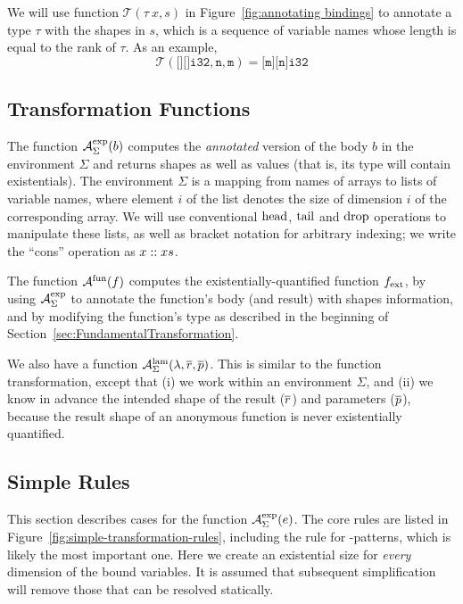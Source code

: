We will use function \(\mathcal{T}(\tau~x,s)\) in
Figure~\ref{fig:annotating bindings} to annotate a type \(\tau\) with
the shapes in \(s\), which is a sequence of variable names whose
length is equal to the rank of \(\tau\).  As an example,
\[
\mathcal{T}(\texttt{[][]i32}, \texttt{n}, \texttt{m}) = \texttt{[m][n]i32}
\]

\subsection{Transformation Functions}
\label{sec:TransformationFunctions}

The function \(\mathcal{A}_{\Sigma}^{\text{exp}}(b)\) computes the \textit{annotated}
version of the body \(b\) in the environment \(\Sigma\) and returns
shapes as well as values (that is, its type will contain
existentials).  The environment \(\Sigma\) is a mapping from names of
arrays to lists of variable names, where element \(i\) of the list
denotes the size of dimension \(i\) of the corresponding array.  We
will use conventional \(\textrm{head}\), \(\textrm{tail}\) and \(\textrm{drop}\) operations to
manipulate these lists, as well as bracket notation for arbitrary
indexing; we write the ``cons'' operation as \(x :: xs\).

The function \(\mathcal{A}^{\text{fun}}(f)\) computes the existentially-quantified 
function \(f_{\textrm{ext}}\), by using  \(\mathcal{A}_{\Sigma}^{\text{exp}}\) to annotate
the function's body (and result) with shapes information, and by modifying
the function's type as described in the beginning of
Section~\ref{sec:FundamentalTransformation}.

We also have a function
\(\mathcal{A}_{\Sigma}^{\text{lam}}(\lambda,\overline{r},\overline{p})\).  This is
similar to the function transformation, except that (i) we work within
an environment \(\Sigma\), and (ii) we know in advance the intended shape
of the result (\(\overline{r}\)) and parameters
(\(\overline{p}\)), because the result shape of an anonymous function
is never existentially quantified.

\subsection{Simple Rules}
\label{sec:SimpleRules}

This section describes cases for the function
\(\mathcal{A}_{\Sigma}^{\text{exp}}(e)\).  The core rules are listed in
Figure~\ref{fig:simple-transformation-rules}, including the rule for
-patterns, which is likely the most important one.  Here we
create an existential size for \textit{every} dimension of the bound
variables.  It is assumed that subsequent simplification will remove
those that can be resolved statically.

